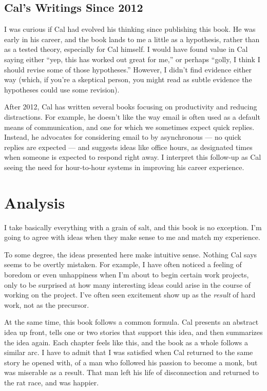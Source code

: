 \documentclass[
]{article}
\begin{document}
\hypertarget{cals-writings-since-2012}{%
\subsection{Cal's Writings Since 2012}\label{cals-writings-since-2012}}

I was curious if Cal had evolved his thinking since publishing this
book. He was early in his career, and the book lands to me a little as a
hypothesis, rather than as a tested theory, especially for Cal himself.
I would have found value in Cal saying either ``yep, this has worked out
great for me,'' or perhaps ``golly, I think I should revise some of
those hypotheses.'' However, I didn't find evidence either way (which,
if you're a skeptical person, you might read as subtle evidence the
hypotheses could use some revision).

After 2012, Cal has written several books focusing on productivity and
reducing distractions. For example, he doesn't like the way email is
often used as a default means of communication, and one for which we
sometimes expect quick replies. Instead, he advocates for considering
email to by asynchronous --- no quick replies are expected --- and
suggests ideas like office hours, as designated times when someone is
expected to respond right away. I interpret this follow-up as Cal seeing
the need for hour-to-hour systems in improving his career experience.

\hypertarget{analysis}{%
\section{Analysis}\label{analysis}}

I take basically everything with a grain of salt, and this book is no
exception. I'm going to agree with ideas when they make sense to me and
match my experience.

To some degree, the ideas presented here make intuitive sense. Nothing
Cal says seems to be overtly mistaken. For example, I have often noticed
a feeling of boredom or even unhappiness when I'm about to begin certain
work projects, only to be surprised at how many interesting ideas could
arise in the course of working on the project. I've often seen
excitement show up as the \emph{result} of hard work, not as the
precursor.

At the same time, this book follows a common formula. Cal presents an
abstract idea up front, tells one or two stories that support this idea,
and then summarizes the idea again. Each chapter feels like this, and
the book as a whole follows a similar arc. I have to admit that I was
satisfied when Cal returned to the same story he opened with, of a man
who followed his passion to become a monk, but was miserable as a
result. That man left his life of disconnection and returned to the rat
race, and was happier.
\end{document}
